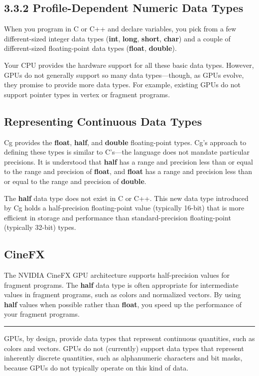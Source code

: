 \documentclass{book}
\begin{document}
\subsection{3.3.2 Profile-Dependent Numeric Data Types}

When you program in C or C++ and declare variables, you pick from a few different-sized integer data types (\textbf{int}, \textbf{long}, \textbf{short}, \textbf{char}) and a couple of different-sized floating-point data types (\textbf{float}, \textbf{double}).

Your CPU provides the hardware support for all these basic data types. However, GPUs do not generally support so many data types—though, as GPUs evolve, they promise to provide more data types. For example, existing GPUs do not support pointer types in vertex or fragment programs.

\subsection*{Representing Continuous Data Types}

Cg provides the \textbf{float}, \textbf{half}, and \textbf{double} floating-point types. Cg's approach to defining these types is similar to C's—the language does not mandate particular precisions. It is understood that \textbf{half} has a range and precision less than or equal to the range and precision of \textbf{float}, and \textbf{float} has a range and precision less than or equal to the range and precision of \textbf{double}.

The \textbf{half} data type does not exist in C or C++. This new data type introduced by Cg holds a half-precision floating-point value (typically 16-bit) that is more efficient in storage and performance than standard-precision floating-point (typically 32-bit) types.

\subsection*{CineFX}

The NVIDIA CineFX GPU architecture supports half-precision values for fragment programs. The \textbf{half} data type is often appropriate for intermediate values in fragment programs, such as colors and normalized vectors. By using \textbf{half} values when possible rather than \textbf{float}, you speed up the performance of your fragment programs.
\hrule

GPUs, by design, provide data types that represent continuous quantities, such as colors and vectors. GPUs do not (currently) support data types that represent inherently discrete quantities, such as alphanumeric characters and bit masks, because GPUs do not typically operate on this kind of data.
\end{document}
